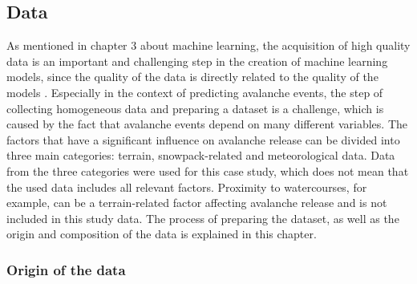 \documentclass[../masterarbeit.tex]{subfiles}
\begin{document}
	




\subsection{Data}
As mentioned in chapter 3 about machine learning, the acquisition of high quality data is an important and challenging step in the creation of machine learning models, since the quality of the data is directly related to the quality of the models \textcite[]{SUBASI202091}. Especially in the context of predicting avalanche events, the step of collecting homogeneous data and preparing a dataset is a challenge, which is caused by the fact that avalanche events depend on many different variables. The factors that have a significant influence on avalanche release can be divided into three main categories: terrain, snowpack-related and meteorological data.\autocite[]{Bahram:2019} Data from the three categories were used for this case study, which does not mean that the used data includes all relevant factors. Proximity to watercourses, for example, can be a terrain-related factor affecting avalanche release \textcite[]{Bahram:2019} and is not included in this study data. The process of preparing the dataset, as well as the origin and composition of the data is explained in this chapter.

\subsubsection{Origin of the data}
\end{document}

